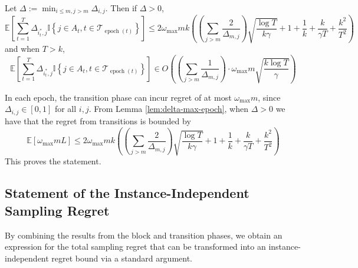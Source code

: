 \documentclass[opre,blindrev]{informs3}
\newcommand{\epoch}{\operatorname{epoch}}
\newcommand{\ind}[1]{\mathbb{I}\left\{#1\right\}}
\newcommand{\bE}[1]{{\mathbb{E}\left[#1\right]}}
\begin{document}
\begin{APPENDICES}
\begin{lemma}\label{lem:delta-transition-regret}
    Let \(\Delta:=\min_{i\leq m, j>m}\Delta_{i,j}\). Then if \(\Delta>0\),
    \[\bE{\sum_{t=1}^T\Delta_{i^*_t, j}\ind{j\in A_t, t\in \mathcal{T}_{\epoch(t)}}}\leq 2\omega_{\max}mk\left(\left(\sum_{j>m}\frac{2}{\Delta_{m,j}}\right)\sqrt{\frac{\log T}{k\gamma}}+1+\frac{1}{k}+\frac{k}{\gamma T}+\frac{k^2}{T^2}\right)\]
    and when \(T>k\),
    \[\bE{\sum_{t=1}^T\Delta_{i^*_t, j}\ind{j\in A_t, t\in \mathcal{T}_{\epoch(t)}}} \in O\!\left(\left(\sum_{j>m}\frac{1}{\Delta_{m,j}}\right)\cdot \omega_{\max}m\sqrt{\frac{k\log T}{\gamma}}\right)\]
\end{lemma}
    In each epoch, the transition phase can incur regret of at most \(\omega_{\max} m\), since \(\Delta_{i,j}\in [0,1]\) for all \(i,j\). From Lemma \ref{lem:delta-max-epoch}, when \(\Delta>0\) we have that the regret from transitions is bounded by
    \[\bE{\omega_{\max}mL}\leq 2\omega_{\max}mk\left(\left(\sum_{j>m}\frac{2}{\Delta_{m,j}}\right)\sqrt{\frac{\log T}{k\gamma}}+1+\frac{1}{k}+\frac{k}{\gamma T}+\frac{k^2}{T^2}\right)\]
    This proves the statement.
\Halmos

\subsection{Statement of the Instance-Independent Sampling Regret}
By combining the results from the block and transition phases, we obtain an expression for the total sampling regret that can be transformed into an instance-independent regret bound via a standard argument.


\end{APPENDICES}
\end{document}
